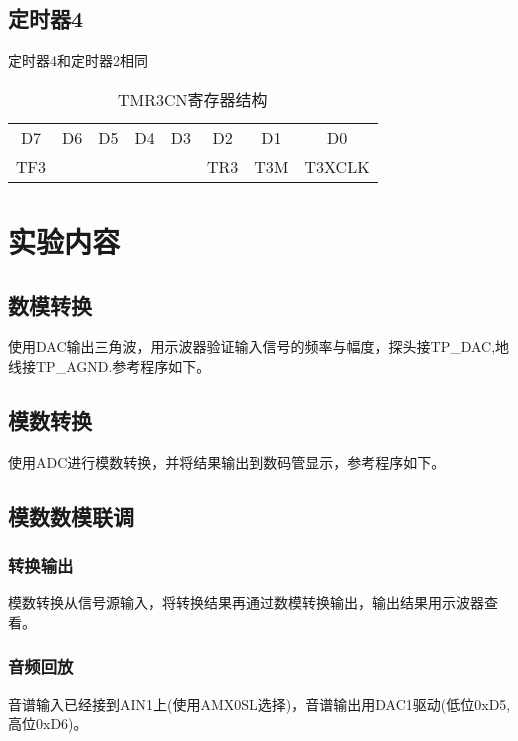 \begin{CJK}
\begin{table}[!htbp]
\end{table}

\subsection{定时器4}
定时器4和定时器2相同
\begin{table}[!htbp]
  \centering
  \caption{TMR3CN寄存器结构}
  \begin{tabular}{|c|c|c|c|c|c|c|c|}
    \hline
    D7&D6&D5&D4&D3&D2&D1&D0\\
    TF3&&&&&TR3&T3M&T3XCLK\\
    \hline
  \end{tabular}

\end{table}
\section{实验内容}
\subsection{数模转换}
使用DAC输出三角波，用示波器验证输入信号的频率与幅度，探头接TP_DAC,地线接TP_AGND.参考程序如下。
  \vspace{5mm}
	
	\vspace{3mm}

\subsection{模数转换}
使用ADC进行模数转换，并将结果输出到数码管显示，参考程序如下。
	\vspace{5mm}
	\vspace{3mm}

\subsection{模数数模联调}
\subsubsection{转换输出}
模数转换从信号源输入，将转换结果再通过数模转换输出，输出结果用示波器查看。
\subsubsection{音频回放}
音谱输入已经接到AIN1上(使用AMX0SL选择)，音谱输出用DAC1驱动(低位0xD5,高位0xD6)。

\end{CJK}

